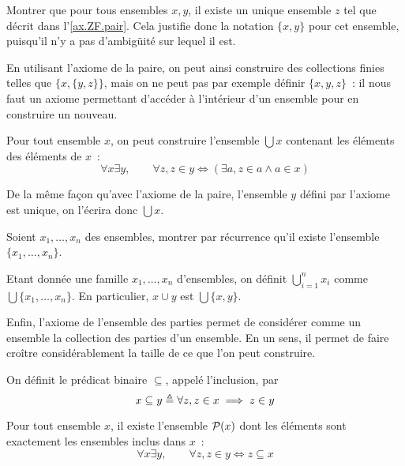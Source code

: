 \begin{exercise}
  Montrer que pour tous ensembles $x,y$, il existe un unique ensemble $z$ tel
  que décrit dans l'\cref{ax.ZF.pair}. Cela justifie donc la notation $\{x,y\}$
  pour cet ensemble, puisqu'il n'y a pas d'ambigüité sur lequel il est.
\end{exercise}

En utilisant l'axiome de la paire, on peut ainsi construire des collections
finies telles que $\{x,\{y,z\}\}$, mais on ne peut pas par exemple définir
$\{x,y,z\}$~: il nous faut un axiome permettant d'accéder à l'intérieur d'un
ensemble pour en construire un nouveau.

\begin{axiom}[Union]\label{ax.ZF.union}
  Pour tout ensemble $x$, on peut construire l'ensemble $\bigcup x$ contenant
  les éléments des éléments de $x$~:
  \[\forall x \exists y,\qquad \forall z, z\in y \iff
  (\exists a, z \in a \land a \in x)\]
\end{axiom}

\begin{notation}
  De la même façon qu'avec l'axiome de la paire, l'ensemble $y$ défini par
  l'axiome est unique, on l'écrira donc $\bigcup x$.
\end{notation}

\begin{exercise}
  Soient $x_1,\ldots,x_n$ des ensembles, montrer par récurrence qu'il existe
  l'ensemble $\{x_1,\ldots,x_n\}$.
\end{exercise}

\begin{notation}
  Etant donnée une famille $x_1,\ldots,x_n$ d'ensembles, on définit
  $\displaystyle \bigcup_{i = 1}^n x_i$ comme $\bigcup\{x_1,\ldots,x_n\}$. En
  particulier, $x \cup y$ est $\bigcup\{x,y\}$.
\end{notation}

Enfin, l'axiome de l'ensemble des parties permet de considérer comme un ensemble
la collection des parties d'un ensemble. En un sens, il permet de faire croître
considérablement la taille de ce que l'on peut construire.

\begin{notation}
  On définit le prédicat binaire $\subseteq$, appelé l'inclusion, par
  \[x \subseteq y \triangleq \forall z, z \in x \implies z \in y\]
\end{notation}

\begin{axiom}\label{ax.ZF.pow}
  Pour tout ensemble $x$, il existe l'ensemble $\mathcal{P} (x)$ dont les éléments
  sont exactement les ensembles inclus dans $x$~:
  \[\forall x\exists y, \qquad \forall z, z \in y \iff z \subseteq x\]
\end{axiom}

